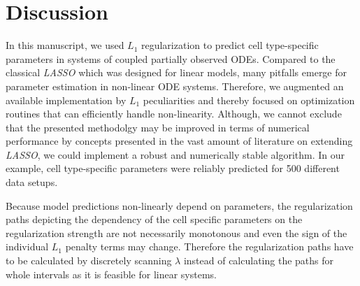 \documentclass{bioinfo}
\begin{document}
%
%









%
%






\section{Discussion}
In this manuscript, we used $L_1$ regularization to predict cell type-specific parameters in systems of coupled partially observed ODEs.
Compared to the classical \emph{LASSO} which was designed for linear models, many pitfalls emerge for parameter estimation in non-linear ODE systems.
Therefore, we augmented an available implementation by $L_1$ peculiarities
and thereby focused on optimization routines that can efficiently handle non-linearity.
Although, we cannot exclude that the presented methodolgy may be improved in terms of numerical performance by concepts presented in the vast amount of literature on extending \emph{LASSO}, 
we could implement a robust and numerically stable algorithm.
In our example, cell type-specific parameters were reliably predicted for 500 different data setups.

Because model predictions non-linearly depend on parameters, 
the regularization paths depicting the dependency of the cell specific parameters on the regularization strength 
are not necessarily monotonous and even the sign of the individual $L_1$ penalty terms may change.
Therefore the regularization paths have to be calculated by discretely scanning $\lambda$ 
instead of calculating the paths for whole intervals as it is feasible for linear systems.
\end{document}
